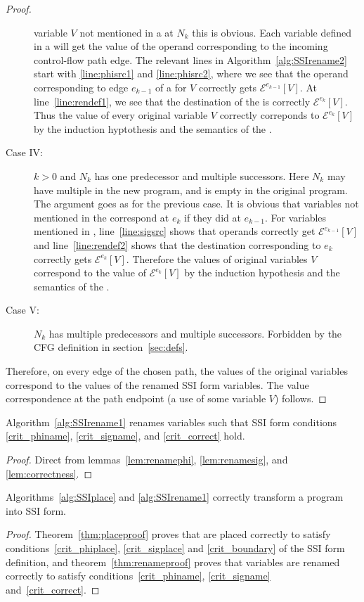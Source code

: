 \documentclass[12pt,titlepage,twoside]{article}
\begin{document}
\begin{proof}
\begin{description}
variable $V$ not mentioned in a \phifunction{} at $N_k$ this is
obvious.  Each variable defined in a \phifunction{} will get the value
of the operand corresponding to the incoming control-flow path edge.
The relevant lines in Algorithm~\ref{alg:SSIrename2} start with
\ref{line:phisrc1} and \ref{line:phisrc2}, where we see that the
operand corresponding to edge $e_{k-1}$ of a \phifunction{} for $V$
correctly gets $\mathcal{E}^{e_{k-1}}[V]$.  At
line~\ref{line:rendef1}, we see that the destination of the
\phifunction{} is correctly $\mathcal{E}^{e_k}[V]$.  Thus the value of
every original variable $V$ correctly correponds to
$\mathcal{E}^{e_k}[V]$ by the induction hyptothesis and the semantics
of the .
\item[Case IV:] $k>0$ and $N_k$ has one predecessor and multiple
successors.  Here $N_k$ may have multiple  in the new
program, and is empty in the original program.  The argument goes as
for the previous case.  It is obvious that variables not mentioned in
the  correspond at $e_k$ if they did at $e_{k-1}$.  For
variables mentioned in , line~\ref{line:sigsrc} shows
that operands correctly get $\mathcal{E}^{e_{k-1}}[V]$ and
line~\ref{line:rendef2} shows that the destination corresponding to
$e_k$ correctly gets $\mathcal{E}^{e_k}[V]$.  Therefore the values of
original variables $V$ correspond to the value of
$\mathcal{E}^{e_k}[V]$ by the induction hypothesis and the semantics
of the .
\item[Case V:] $N_k$ has multiple predecessors and multiple
successors.  Forbidden by the CFG definition in section~\ref{sec:defs}.
\end{description}
Therefore, on every edge of the chosen path, the values of the
original variables correspond to the values of the renamed SSI form
variables. The value correspondence at the path endpoint (a use of
some variable $V$) follows.
\end{proof}

\begin{theorem}\label{thm:renameproof}
Algorithm~\ref{alg:SSIrename1} renames variables such that SSI form
conditions \ref{crit_phiname}, \ref{crit_signame}, and
\ref{crit_correct} hold.
\end{theorem}
\begin{proof}
Direct from lemmas~\ref{lem:renamephi}, \ref{lem:renamesig}, and
\ref{lem:correctness}.
\end{proof}

\begin{theorem}
Algorithms~\ref{alg:SSIplace} and \ref{alg:SSIrename1} correctly
transform a program into SSI form.
\end{theorem}
\begin{proof}
Theorem~\ref{thm:placeproof} proves that  are placed
correctly to satisfy conditions~\ref{crit_phiplace},
\ref{crit_sigplace} and \ref{crit_boundary} of the SSI form
definition, and theorem~\ref{thm:renameproof} proves that variables
are renamed correctly to satisfy conditions~\ref{crit_phiname},
\ref{crit_signame} and~\ref{crit_correct}.
\end{proof}
\end{document}
